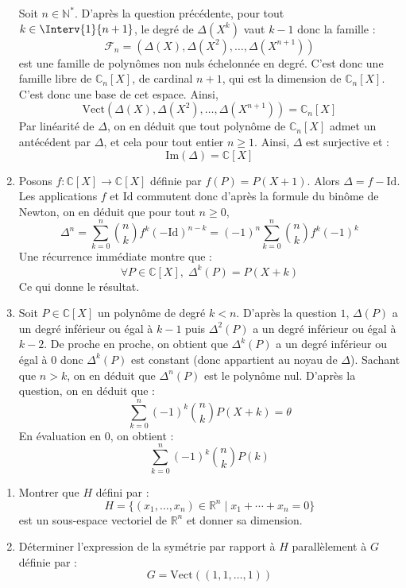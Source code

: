 \documentclass[a4paper,10pt]{report}
\begin{document}
\begin{enumerate}
\noindent Soit $n \in \mathbb{N}^*$. D'après la question précédente, pour tout $k \in \Interv{1}{n+1}$, le degré de $\Delta(X^k)$ vaut $k-1$ donc la famille :
$$ \mathcal{F}_n = (\Delta(X), \Delta(X^2), \ldots, \Delta(X^{n+1}))$$
 est une famille de polynômes non nuls échelonnée en degré. C'est donc une famille libre de $\mathbb{C}_n[X]$, de cardinal $n+1$, qui est la dimension de $\mathbb{C}_n[X]$. C'est donc une base de cet espace. Ainsi,
 $$ \textrm{Vect}(\Delta(X), \Delta(X^2), \ldots, \Delta(X^{n+1})) = \mathbb{C}_n[X]$$
 Par linéarité de $\Delta$, on en déduit que tout polynôme de $\mathbb{C}_n[X]$ admet un antécédent par $\Delta$, et cela pour tout entier $n \geq 1$. Ainsi, $\Delta$ est surjective et :
 $$ \textrm{Im}(\Delta) = \mathbb{C}[X]$$
 \item Posons $f : \mathbb{C}[X] \rightarrow \mathbb{C}[X]$ définie par $f(P)=P(X+1)$. Alors $\Delta = f - \textrm{Id}$. Les applications $f$ et $\textrm{Id}$ commutent donc d'après la formule du binôme de Newton, on en déduit que pour tout $n \geq 0$,
 $$ \Delta^n = \sum_{k=0}^n \binom{n}{k} f^k (- \textrm{Id})^{n-k}  = (-1)^n \sum_{k=0}^n \binom{n}{k} f^k (-1)^k$$
 Une récurrence immédiate montre que :
 $$ \forall P \in \mathbb{C}[X], \; \Delta^k (P)= P(X+k)$$
 Ce qui donne le résultat.
 \item Soit $P \in \mathbb{C}[X]$ un polynôme de degré $k <n$. D'après la question $1$, $\Delta(P)$ a un degré inférieur ou égal à $k-1$ puis $\Delta^2(P)$ a un degré inférieur ou égal à $k-2$. De proche en proche, on obtient que $\Delta^k(P)$ a un degré inférieur ou égal à $0$ donc $\Delta^k(P)$ est constant (donc appartient au noyau de $\Delta$). Sachant que $n>k$, on en déduit que $\Delta^n(P)$ est le polynôme nul. D'après la question, on en déduit que :
$$\sum_{k = 0}^{n} ( - 1)^{k} \binom{n}{k}P(X + k) = \theta$$
 En évaluation en $0$, on obtient :
 $$ \sum_{k = 0}^{n} ( - 1)^{k} \binom{n}{k}P(k)$$
\end{enumerate}

\begin{Exa} 
\begin{enumerate}
\item Montrer que $H$ défini par :
$$ H = \lbrace (x_1, \ldots, x_n)\in \mathbb{R}^n \; \vert \;    x_1 + \cdots + x_n = 0 \rbrace$$
est un sous-espace vectoriel de $\mathbb{R}^n$ et donner sa dimension.
\item Déterminer l'expression de la symétrie par rapport à $H$ parallèlement à $G$ définie par :
$$ G = \textrm{Vect}((1,1, \ldots, 1))$$
\end{enumerate}
\end{Exa}
\end{document}
